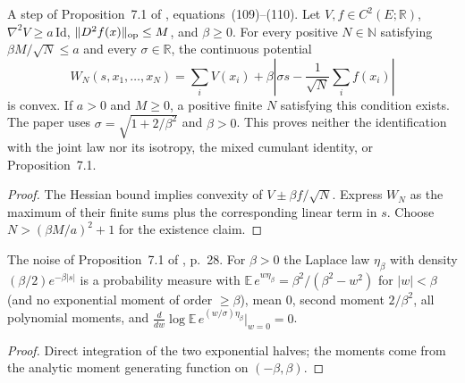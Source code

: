 \begin{lemma}
  \label{lem:bkl-suspension-convexity}
  \leanok
  A step of Proposition~7.1 of \cite{BizeulKlartagLehec2026}, equations~(109)--(110).
  Let $V,f\in C^2(E;\mathbb R)$, $\nabla^2V\ge a\,\mathrm{Id}$,
  $\lVert D^2f(x)\rVert_{\mathrm{op}}\le M$, and $\beta\ge0$.
  For every positive $N\in\mathbb N$ satisfying $\beta M/\sqrt N\le a$ and every
  $\sigma\in\mathbb R$, the continuous potential
  \[
    W_N(s,x_1,\ldots,x_N)=\sum_i V(x_i)+
       \beta\left|\sigma s-\frac{1}{\sqrt N}\sum_i f(x_i)\right|
  \]
  is convex. If $a>0$ and $M\ge0$, a positive finite $N$ satisfying this
  condition exists. The paper uses $\sigma=\sqrt{1+2/\beta^2}$ and $\beta>0$.
  This proves neither the identification with the joint law nor its isotropy,
  the mixed cumulant identity, or Proposition~7.1.
\end{lemma}
\begin{proof}
  \leanok
  The Hessian bound implies convexity of $V\pm\beta f/\sqrt N$.
  Express $W_N$ as the maximum of their finite sums plus the corresponding
  linear term in $s$. Choose $N>(\beta M/a)^2+1$ for the existence claim.
\end{proof}

\begin{lemma}
  \label{lem:bkl-laplace-law}
  \leanok
  The noise of Proposition~7.1 of \cite{BizeulKlartagLehec2026}, p.~28. For $\beta>0$ the
  Laplace law $\eta_\beta$ with density $(\beta/2)e^{-\beta|s|}$ is a probability measure with
  $\mathbb E\,e^{w\eta_\beta}=\beta^2/(\beta^2-w^2)$ for $|w|<\beta$ (and no exponential moment
  of order $\ge\beta$), mean $0$, second moment $2/\beta^2$, all polynomial moments, and
  $\frac{d}{dw}\log\mathbb E\,e^{(w/\sigma)\eta_\beta}\big|_{w=0}=0$.
\end{lemma}
\begin{proof}
  \leanok
  Direct integration of the two exponential halves; the moments come from the analytic
  moment generating function on $(-\beta,\beta)$.
\end{proof}

